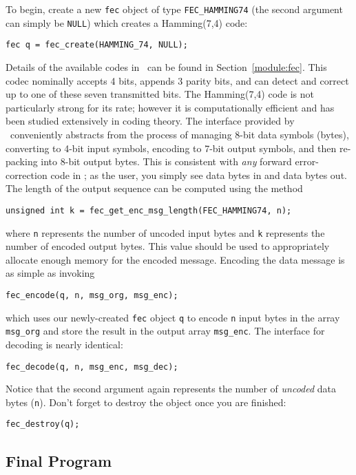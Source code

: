 To begin, create a new {\tt fec} object of type {\tt FEC\_HAMMING74}
(the second argument can simply be {\tt NULL})
which creates a Hamming(7,4) code:
%
\begin{Verbatim}[fontsize=\small]
    fec q = fec_create(HAMMING_74, NULL);
\end{Verbatim}
%
Details of the available codes in \liquid\ can be found in
Section~\ref{module:fec}.
This codec nominally accepts 4 bits, appends 3 parity bits, and can
detect and correct up to one of these seven transmitted bits.
The Hamming(7,4) code is not particularly strong for its rate;
however it is computationally efficient and has been studied extensively
in coding theory.
The interface provided by \liquid\ conveniently abstracts from the
process of managing 8-bit data symbols (bytes), converting to 4-bit
input symbols, encoding to 7-bit output symbols, and then re-packing
into 8-bit output bytes.
This is consistent with {\em any} forward error-correction code in
\liquid;
as the user, you simply see data bytes in and data bytes out.
The length of the output sequence can be computed using the method
%
\begin{Verbatim}[fontsize=\small]
    unsigned int k = fec_get_enc_msg_length(FEC_HAMMING74, n);
\end{Verbatim}
%
where {\tt n} represents the number of uncoded input bytes
and   {\tt k} represents the number of encoded output bytes.
This value should be used to appropriately allocate enough memory for
the encoded message.
%
Encoding the data message is as simple as invoking
%
\begin{Verbatim}[fontsize=\small]
    fec_encode(q, n, msg_org, msg_enc);
\end{Verbatim}
%
which uses our newly-created {\tt fec} object {\tt q} to encode {\tt n}
input bytes in the array {\tt msg\_org} and store the result in the
output array {\tt msg\_enc}.
The interface for decoding is nearly identical:
%
\begin{Verbatim}[fontsize=\small]
    fec_decode(q, n, msg_enc, msg_dec);
\end{Verbatim}
%
Notice that the second argument again represents the number of
{\em uncoded} data bytes ({\tt n}).
Don't forget to destroy the object once you are finished:
%
\begin{Verbatim}[fontsize=\small]
    fec_destroy(q);
\end{Verbatim}
%


\subsection{Final Program}
\label{tutorial:fec:completed}

